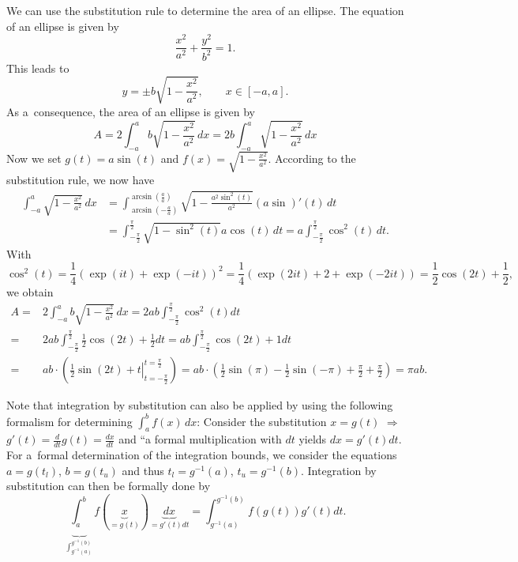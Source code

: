 \begin{example}
We can use the substitution rule to determine the area of an ellipse. The equation of an ellipse is given by
\[\frac{x^2}{a^2}+\frac{y^2}{b^2}=1.\]
This leads to
\[y=\pm b\sqrt{1-\frac{x^2}{a^2}},\qquad x\in[-{a},a].\]
As a~consequence, the area of an ellipse is given by
\[A=2\int_{-a}^ab\sqrt{1-\frac{x^2}{a^2}}\, dx=2b\int_{-a}^a\sqrt{1-\frac{x^2}{a^2}}\, dx\]
Now we set $g(t)=a\sin(t)$ and $f(x)=\sqrt{1-\frac{x^2}{a^2}}$. According to the substitution rule, we now have
\[
\begin{aligned}
\int_{-a}^a\sqrt{1-\frac{x^2}{a^2}}\, dx&=\int_{\arcsin\left(-\frac{a}a\right)}^{\arcsin\left(\frac{a}a\right)}\sqrt{1-\frac{a^2\sin^2(t)}{a^2}}(a\sin)'(t)\,dt\\
&=\int_{-\frac\pi2}^{\frac\pi2}\sqrt{1-\sin^2(t)}a\cos(t)\,dt=a\int_{-\frac\pi2}^{\frac\pi2}\cos^2(t)\,dt.
\end{aligned}
\]
With
\[\cos^2(t)=\frac14(\exp(it)+\exp(-it))^2=\frac14(\exp(2it)+2+\exp(-2it))=\frac12\cos(2t)+\frac12,\]
we obtain
\[
\begin{aligned}
A=&2\int_{-a}^ab\sqrt{1-\frac{x^2}{a^2}}\, dx
=2ab\int_{-\frac\pi2}^{\frac\pi2}\cos^2(t)dt\\=&2ab\int_{-\frac\pi2}^{\frac\pi2}\frac12\cos(2t)+\frac12dt
=ab\int_{-\frac\pi2}^{\frac\pi2}\cos(2t)+1dt\\
=&ab\cdot\left(\left.\frac{1}2\sin(2t)+t\right|_{t=-\frac\pi2}^{t=\frac\pi2}\right)
=ab\cdot\left(\frac12\sin(\pi)-\frac12\sin\left(-\pi\right)+\frac\pi2+\frac\pi2\right)=\pi ab.
\end{aligned}
\]
\end{example}

Note that integration by substitution can also be applied by using the following formalism for determining $\int_a^b f(x)\, dx$:
Consider the substitution $x=g(t)$ $\Rightarrow$ $g'(t)=\frac{d}{dt}g(t)=\frac{dx}{dt}$ and ``a formal multiplication with $dt$ yields $dx=g'(t)dt$. For a~formal determination of the integration bounds, we consider the equations $a=g(t_l)$, $b=g(t_u)$ and thus $t_l=g^{-1}(a)$, $t_u=g^{-1}(b)$. Integration by substitution can then be formally done by
\[\underbrace{\int_a^b}_{\int_{g^{-1}(a)}^{g^{-1}(b)}} f(\underbrace{x}_{=g(t)})\underbrace{dx}_{=g'(t)dt}=\int_{g^{-1}(a)}^{g^{-1}(b)}f(g(t))g'(t)dt.\]

